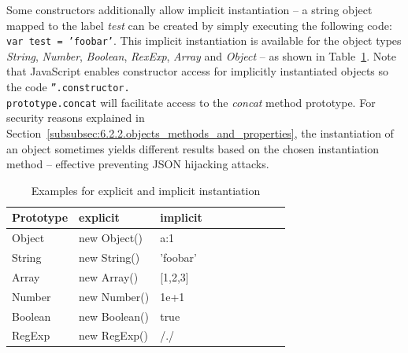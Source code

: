     Some constructors additionally allow implicit instantiation -- a string object mapped to the label \textit{test} can be created by simply executing the following code: \texttt{var test = 'foobar'}. This implicit instantiation is available for the object types \textit{String}, \textit{Number}, \textit{Boolean}, \textit{RexExp}, \textit{Array} and \textit{Object} -- as shown in Table~\ref{tbl:implicit-instatiation}. Note that JavaScript enables constructor access for implicitly instantiated objects so the code \texttt{''.constructor.\\
prototype.concat} will facilitate access to the \textit{concat} method prototype. For security reasons explained in Section~\ref{subsubsec:6.2.2.objects_methods_and_properties}, the instantiation of an object sometimes yields different results based on the chosen instantiation method -- effective preventing JSON hijacking attacks.\\

\begin{table}
  \centering
    \begin{tabular}{| l | l | l | l | l | l | l | l | l | l |}
    \hline
    Prototype & explicit & implicit  \\ \hline
    Object  & new Object() & {a:1} \\ \hline
    String & new String() & 'foobar' \\ \hline
    Array & new Array() & [1,2,3] \\ \hline
    Number & new Number() & 1e+1 \\ \hline
    Boolean & new Boolean() & true \\ \hline
    RegExp & new RegExp() & /./ \\ \hline
    \end{tabular}
    \label{tbl:implicit-instatiation}
    \caption{Examples for explicit and implicit instantiation}
\end{table}

